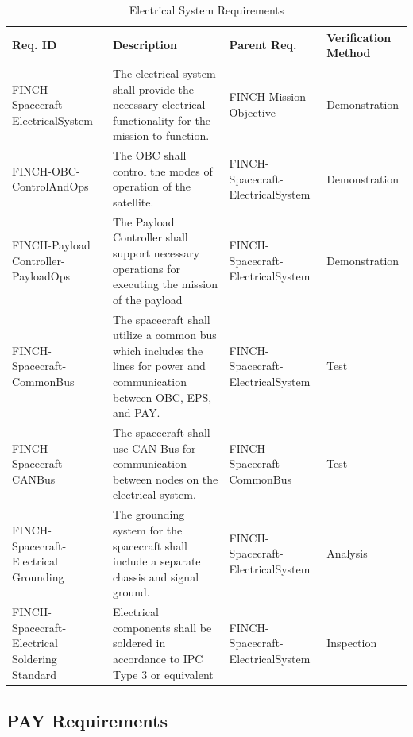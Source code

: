 \documentclass[12pt,a4paper]{article}
\begin{document}
    \begin{table}[H]
        \centering
        \begin{tabular}{|>{\centering\arraybackslash}m{3cm} 
                    |>{\raggedright\arraybackslash}m{7cm} 
                    |>{\centering\arraybackslash}m{3cm} 
                    |>{\centering\arraybackslash}m{2.5cm}|}\hline
            \textbf{Req. ID} & \centering \textbf{Description} & \textbf{Parent Req.} & \textbf{Verification Method}\\\hline
             FINCH-Spacecraft-ElectricalSystem&  The electrical system shall provide the necessary electrical functionality for the mission to function. &  FINCH-Mission-Objective& Demonstration\\\hline
 FINCH-OBC-ControlAndOps& The OBC shall control the modes of operation of the satellite. & FINCH-Spacecraft-ElectricalSystem&Demonstration\\\hline
 FINCH-Payload Controller-PayloadOps& The Payload Controller shall support necessary operations for executing the mission of the payload& FINCH-Spacecraft-ElectricalSystem&Demonstration\\\hline
             FINCH-Spacecraft-CommonBus&  The spacecraft shall utilize a common bus which includes the lines for power and communication between OBC, EPS, and PAY. &  FINCH-Spacecraft-ElectricalSystem& Test\\\hline
             FINCH-Spacecraft-CANBus&  The spacecraft shall use CAN Bus for communication between nodes on the electrical system.&  FINCH-Spacecraft-CommonBus& Test\\\hline
             FINCH-Spacecraft-Electrical Grounding&  The grounding system for the spacecraft shall include a separate chassis and signal ground.&  FINCH-Spacecraft-ElectricalSystem& Analysis\\\hline
             FINCH-Spacecraft-Electrical Soldering Standard&  Electrical components shall be soldered in accordance to IPC Type 3 or equivalent&  FINCH-Spacecraft-ElectricalSystem& Inspection\\\hline
        \end{tabular}
        \caption{Electrical System Requirements}\label{tab:elec_sys_req}
    \end{table}
    
    \subsection{PAY Requirements}
\end{document}
